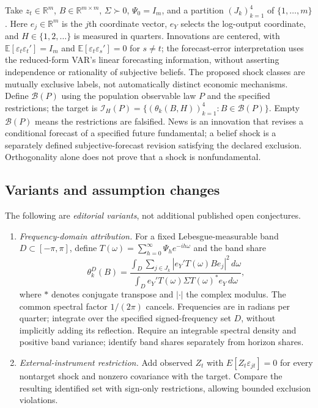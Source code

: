 \documentclass[11pt,a4paper]{article}
\newcommand{\E}{\mathbb E}
\begin{document}
Take \(z_t\in\mathbb R^m\), \(B\in\mathbb R^{m\times m}\), \(\Sigma\succ0\), \(\Psi_0=I_m\), and a partition \((J_k)_{k=1}^4\) of \(\{1,\ldots,m\}\). Here \(e_j\in\mathbb R^m\) is the \(j\)th coordinate vector, \(e_Y\) selects the log-output coordinate, and \(H\in\{1,2,\ldots\}\) is measured in quarters. Innovations are centered, with \(\E[\varepsilon_t\varepsilon_t']=I_m\) and \(\E[\varepsilon_t\varepsilon_s']=0\) for \(s\ne t\); the forecast-error interpretation uses the reduced-form VAR's linear forecasting information, without asserting independence or rationality of subjective beliefs. The proposed shock classes are mutually exclusive labels, not automatically distinct economic mechanisms. Define \(\mathcal B(P)\) using the population observable law \(P\) and the specified restrictions; the target is \(\mathcal I_H(P)=\{(\theta_k(B,H))_{k=1}^4:B\in\mathcal B(P)\}\). Empty \(\mathcal B(P)\) means the restrictions are falsified. News is an innovation that revises a conditional forecast of a specified future fundamental; a belief shock is a separately defined subjective-forecast revision satisfying the declared exclusion. Orthogonality alone does not prove that a shock is nonfundamental.
\subsection*{Variants and assumption changes}
The following are \emph{editorial variants}, not additional published open conjectures.
\begin{enumerate}
\item \emph{Frequency-domain attribution.} For a fixed Lebesgue-measurable band \(D\subset[-\pi,\pi]\), define \(T(\omega)=\sum_{h=0}^{\infty}\Psi_h e^{-ih\omega}\) and the band share
\[
\theta_k^{D}(B)=\frac{\int_D\sum_{j\in J_k}|e_Y'T(\omega)Be_j|^2\,d\omega}
{\int_D e_Y'T(\omega)\Sigma T(\omega)^*e_Y\,d\omega},
\]
where \(*\) denotes conjugate transpose and \(|\cdot|\) the complex modulus. The common spectral factor \(1/(2\pi)\) cancels. Frequencies are in radians per quarter; integrate over the specified signed-frequency set \(D\), without implicitly adding its reflection. Require an integrable spectral density and positive band variance; identify band shares separately from horizon shares.
\item \emph{External-instrument restriction.} Add observed \(Z_t\) with \(E[Z_t\varepsilon_{jt}]=0\) for every nontarget shock and nonzero covariance with the target. Compare the resulting identified set with sign-only restrictions, allowing bounded exclusion violations.
\end{enumerate}
\end{document}

